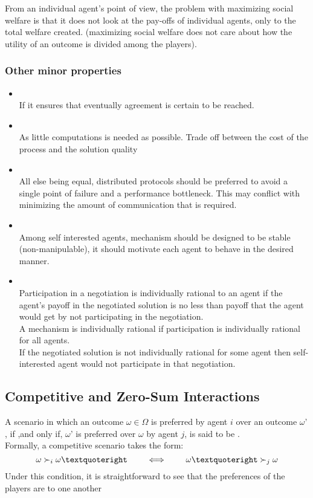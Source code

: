 		From an individual agent’s point of view, the problem with maximizing social welfare is that it does not look at the pay-offs of individual agents, only to the total welfare created. (maximizing social welfare does not care about how the utility of an outcome is divided among the players).


\subsubsection{Other minor properties}
\begin{itemize}
\item {}\\
If it ensures that eventually agreement is certain to be reached.
\item {}\\
As little computations is needed as possible. Trade off between the cost of the process and the solution quality
\item {}\\
All else being equal, distributed protocols should be preferred to avoid a single point of failure and a performance bottleneck. This may conflict with minimizing the amount of communication that is required.
\item {}\\
Among self interested agents, mechanism should be designed to be stable (non-manipulable), it should motivate each agent to behave in the desired manner.
\item {}\\
Participation in a negotiation is individually rational to an agent if the agent's payoff in the negotiated solution is no less than payoff that the agent would get by not participating in the negotiation.\\
A mechanism is individually rational if participation is individually rational for all agents.\\
If the negotiated solution is not individually rational for some agent then self-interested agent would not participate in that negotiation.
\end{itemize}
\subsection{Competitive and Zero-Sum Interactions}
A scenario in which an outcome $\omega\in\Omega$ is preferred by agent $i$ over an outcome $\omega’$, if ,and only if, $\omega’$ is preferred over $\omega$ by agent $j$, is said to be .\\
	Formally, a competitive scenario takes the form:
	\[\omega \cmore_i \omega’\qquad\iff\qquad\omega’\cmore_j \omega\]
	Under this condition, it is straightforward to see that the preferences of the players are  to one another
	
